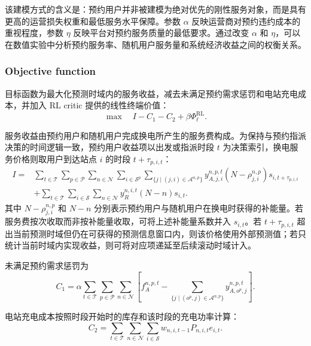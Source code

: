 \documentclass[12pt,hyperref,a4paper,UTF8]{ctexart}
\begin{document}
该建模方式的含义是：预约用户并非被建模为绝对优先的刚性服务对象，而是具有更高的运营损失权重和最低服务水平保障。参数 $\alpha$ 反映运营商对预约违约成本的重视程度，参数 $\eta$ 反映平台对预约服务质量的最低要求。通过改变 $\alpha$ 和 $\eta$，可以在数值实验中分析预约服务率、随机用户服务量和系统经济收益之间的权衡关系。

\subsubsection{Objective function}

目标函数为最大化预测时域内的服务收益，减去未满足预约需求惩罚和电站充电成本，并加入 RL critic 提供的线性终端价值：
\begin{equation}
\max \quad I-C_1-C_2+\beta\Phi^{\mathrm{RL}}_{\ell}.
\label{eq:objective}
\end{equation}

服务收益由预约用户和随机用户完成换电所产生的服务费构成。为保持与预约指派决策的时间逻辑一致，预约用户收益项以出发或指派时段 $t$ 为决策索引，换电服务价格则取用户到达站点 $i$ 的时段 $t+\tau_{p,i,t}$：
\begin{equation}
\begin{aligned}
I=&
\sum_{t\in\mathcal{T}}\sum_{p\in\mathcal{P}}\sum_{n\in\mathcal{N}}
\sum_{i\in\mathcal{S}^{p}}
\sum_{\{j\mid (j,i)\in\mathcal{A}^{n,p}\}}
 y_{A,j,i}^{n,p,t}
\left(N-\rho_{j,i}^{n,p}\right)s_{i,t+\tau_{p,i,t}}
\\
&+
\sum_{t\in\mathcal{T}}\sum_{i\in\mathcal{S}}\sum_{n\in\mathcal{N}}
y_R^{n,i,t}(N-n)s_{i,t}.
\end{aligned}
\label{eq:income}
\end{equation}
其中 $N-\rho_{j,i}^{n,p}$ 和 $N-n$ 分别表示预约用户与随机用户在换电时获得的补能量。若服务费按次收取而非按补能量收取，可将上述补能量系数并入 $s_{i,t}$。若 $t+\tau_{p,i,t}$ 超出当前预测时域但仍在可获得的预测信息窗口内，则该价格使用外部预测值；若只统计当前时域内实现收益，则可将对应项递延至后续滚动时域计入。

未满足预约需求惩罚为
\begin{equation}
C_1 = \alpha \sum_{t\in \mathcal{T}} \sum_{p\in \mathcal{P}}  \sum_{n\in \mathcal{N}} 
\left[
f_A^{n,p,t} - \sum_{\{j \mid (o^p,j) \in \mathcal{A}^{n,p}\}} y_{A,o^p,j}^{n,p,t} \right].
\label{eq:penaltycost}
\end{equation}

电站充电成本按照时段开始时的库存和该时段的充电功率计算：
\begin{equation}
C_2 = \sum_{t \in \mathcal{T}}  \sum_{n \in \mathcal{N}} \sum_{i \in \mathcal{S}}
 w_{n,i,t-1}P_{n,i,t}e_{i,t}.
\label{eq:chargingcost}
\end{equation}
\end{document}
